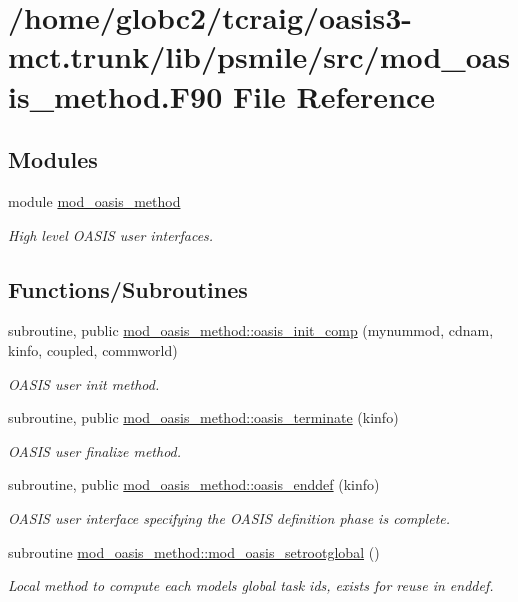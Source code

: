 \hypertarget{mod__oasis__method_8_f90}{}\section{/home/globc2/tcraig/oasis3-\/mct.trunk/lib/psmile/src/mod\+\_\+oasis\+\_\+method.F90 File Reference}
\label{mod__oasis__method_8_f90}
\subsection*{Modules}
\begin{DoxyCompactItemize}
\item 
module \hyperlink{namespacemod__oasis__method}{mod\+\_\+oasis\+\_\+method}
\begin{DoxyCompactList}\small\item\em High level O\+A\+S\+IS user interfaces. \end{DoxyCompactList}\end{DoxyCompactItemize}
\subsection*{Functions/\+Subroutines}
\begin{DoxyCompactItemize}
\item 
subroutine, public \hyperlink{namespacemod__oasis__method_ad266b77f6e75f2d150c80374a841a43c}{mod\+\_\+oasis\+\_\+method\+::oasis\+\_\+init\+\_\+comp} (mynummod, cdnam, kinfo, coupled, commworld)
\begin{DoxyCompactList}\small\item\em O\+A\+S\+IS user init method. \end{DoxyCompactList}\item 
subroutine, public \hyperlink{namespacemod__oasis__method_a4fb881336906c9452b6a9f250af9c3d7}{mod\+\_\+oasis\+\_\+method\+::oasis\+\_\+terminate} (kinfo)
\begin{DoxyCompactList}\small\item\em O\+A\+S\+IS user finalize method. \end{DoxyCompactList}\item 
subroutine, public \hyperlink{namespacemod__oasis__method_a093552f9f9895ac79a5fefa043fc5881}{mod\+\_\+oasis\+\_\+method\+::oasis\+\_\+enddef} (kinfo)
\begin{DoxyCompactList}\small\item\em O\+A\+S\+IS user interface specifying the O\+A\+S\+IS definition phase is complete. \end{DoxyCompactList}\item 
subroutine \hyperlink{namespacemod__oasis__method_a13d6e469ea14642a2e1e6cb807d9b7de}{mod\+\_\+oasis\+\_\+method\+::mod\+\_\+oasis\+\_\+setrootglobal} ()
\begin{DoxyCompactList}\small\item\em Local method to compute each models\textquotesingle{} global task ids, exists for reuse in enddef. \end{DoxyCompactList}\end{DoxyCompactItemize}
